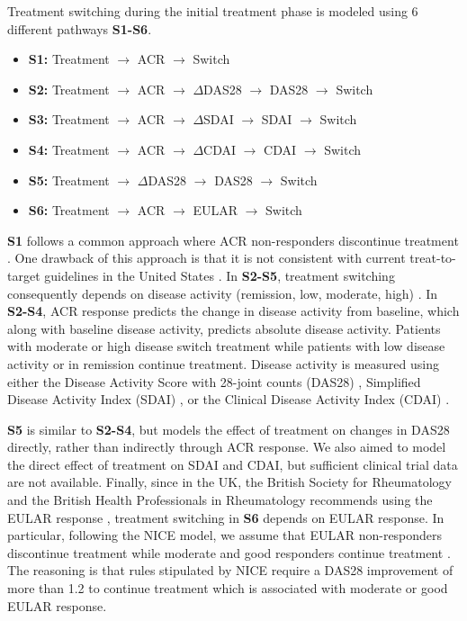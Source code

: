 \documentclass[11pt,final,fleqn]{article}
\theoremstyle{plain}
\begin{document}
Treatment switching during the initial treatment phase is modeled using 6 different pathways \textbf{S1-S6}.

\begin{itemize}
\item \textbf{S1:} Treatment $\rightarrow$ ACR $\rightarrow$ Switch
\item \textbf{S2:} Treatment $\rightarrow$ ACR $\rightarrow$ $\Delta$DAS28 $\rightarrow$ DAS28 $\rightarrow$ Switch 
\item \textbf{S3:} Treatment $\rightarrow$ ACR $\rightarrow$ $\Delta$SDAI $\rightarrow$ SDAI $\rightarrow$ Switch 
\item \textbf{S4:} Treatment $\rightarrow$ ACR $\rightarrow$ $\Delta$CDAI $\rightarrow$ CDAI $\rightarrow$ Switch 
\item \textbf{S5:} Treatment $\rightarrow$ $\Delta$DAS28 $\rightarrow$ DAS28 $\rightarrow$ Switch 
\item \textbf{S6:} Treatment $\rightarrow$ ACR $\rightarrow$ EULAR $\rightarrow$ Switch
\end{itemize}

\textbf{S1} follows a common approach where ACR non-responders discontinue treatment \citep[e.g.][]{carlson2015economic, icer2017tim}. One drawback of this approach is that it is not consistent with current treat-to-target guidelines in the United States \citep{singh20162015}. In \textbf{S2-S5}, treatment switching consequently depends on disease activity (remission, low, moderate, high) \citep{anderson2012rheumatoid}. In \textbf{S2-S4}, ACR response predicts the change in disease activity from baseline, which along with baseline disease activity, predicts absolute disease activity. Patients with moderate or high disease switch treatment while patients with low disease activity or in remission continue treatment. Disease activity is measured using either the Disease Activity Score with 28-joint counts (DAS28) \citep{prevoo1995modified}, Simplified Disease Activity Index (SDAI) \citep{smolen2003simplified, aletaha2005simplified}, or the Clinical Disease Activity Index (CDAI) \citep{aletaha2005acute}. 

\textbf{S5} is similar to \textbf{S2-S4}, but models the effect of treatment on changes in DAS28 directly, rather than indirectly through ACR response. We also aimed to model the direct effect of treatment on SDAI and CDAI, but sufficient clinical trial data are not available. Finally, since in the UK, the British Society for Rheumatology and the British Health Professionals in Rheumatology recommends using the EULAR response \citep{deighton2010bsr}, treatment switching in \textbf{S6} depends on EULAR response. In particular, following the NICE model, we assume that EULAR non-responders discontinue treatment while moderate and good responders continue treatment \citep{stevenson2016adalimumab}. The reasoning is that rules stipulated by NICE require a DAS28 improvement of more than 1.2 to continue treatment which is associated with moderate or good EULAR response. 
\end{document}
